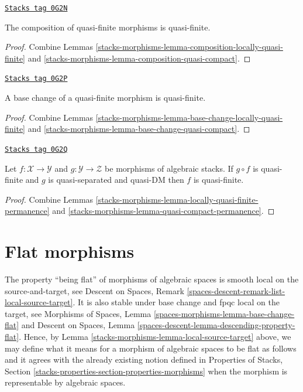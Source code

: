 \begin{lemma}
\label{stacks-morphisms-lemma-composition-quasi-finite}
\href{https://stacks.math.columbia.edu/tag/0G2N}{\texttt{Stacks tag 0G2N}}

The composition of quasi-finite morphisms is quasi-finite.
\end{lemma}

\begin{proof}
Combine
Lemmas \ref{stacks-morphisms-lemma-composition-locally-quasi-finite} and
\ref{stacks-morphisms-lemma-composition-quasi-compact}.
\end{proof}

\begin{lemma}
\label{stacks-morphisms-lemma-base-change-quasi-finite}
\href{https://stacks.math.columbia.edu/tag/0G2P}{\texttt{Stacks tag 0G2P}}

A base change of a quasi-finite morphism is quasi-finite.
\end{lemma}

\begin{proof}
Combine
Lemmas \ref{stacks-morphisms-lemma-base-change-locally-quasi-finite} and
\ref{stacks-morphisms-lemma-base-change-quasi-compact}.
\end{proof}

\begin{lemma}
\label{stacks-morphisms-lemma-quasi-finite-permanence}
\href{https://stacks.math.columbia.edu/tag/0G2Q}{\texttt{Stacks tag 0G2Q}}

Let $f : \mathcal{X} \to \mathcal{Y}$ and
$g : \mathcal{Y} \to \mathcal{Z}$ be morphisms of algebraic stacks.
If $g \circ f$ is quasi-finite and $g$ is quasi-separated and quasi-DM
then $f$ is quasi-finite.
\end{lemma}

\begin{proof}
Combine
Lemmas \ref{stacks-morphisms-lemma-locally-quasi-finite-permanence} and
\ref{stacks-morphisms-lemma-quasi-compact-permanence}.
\end{proof}

\section{Flat morphisms}
\label{stacks-morphisms-section-flat}
The property ``being flat'' of morphisms of algebraic
spaces is smooth local on the source-and-target, see
Descent on Spaces, Remark \ref{spaces-descent-remark-list-local-source-target}.
It is also stable under base change and fpqc local on the target, see
Morphisms of Spaces,
Lemma \ref{spaces-morphisms-lemma-base-change-flat}
and
Descent on Spaces, Lemma
\ref{spaces-descent-lemma-descending-property-flat}.
Hence, by
Lemma \ref{stacks-morphisms-lemma-local-source-target}
above, we may define what it means for a morphism of algebraic spaces
to be flat as follows and it agrees with the already
existing notion defined in
Properties of Stacks,
Section \ref{stacks-properties-section-properties-morphisms}
when the morphism is representable by algebraic spaces.

